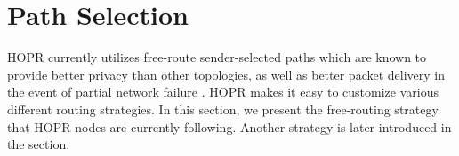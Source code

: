 \section{Path Selection}
\label{sec:path-selection}
HOPR currently utilizes free-route sender-selected paths which are known to provide better privacy than other topologies, as well as better packet delivery in the event of partial network failure \cite{Dingledine2004SynchronousBF}. HOPR makes it easy to customize various different routing strategies. In this section, we present the free-routing strategy that HOPR nodes are currently following. Another strategy is later introduced in the  section.




